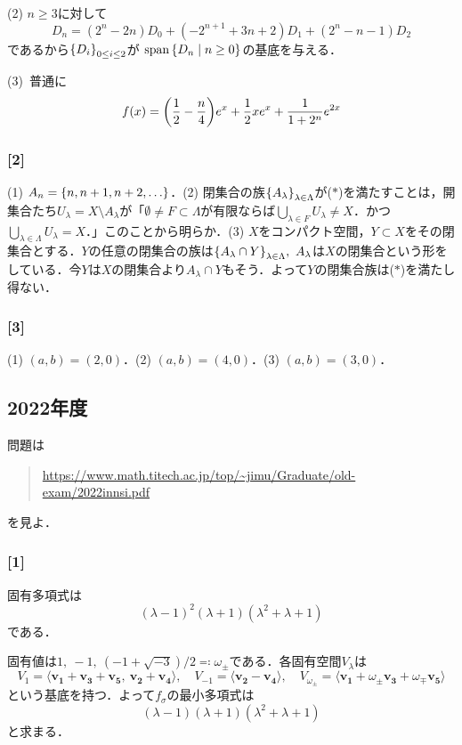 \documentclass[a4j]{ltjsarticle}
\newcommand{\1}{\mathbbm{1}}
\numberwithin{equation}{section}
\theoremstyle{definition}
\begin{document}
(2) $n\geq 3$に対して
\begin{equation}
    D_n=(2^n-2n)D_0+(-2^{n+1}+3n+2)D_1+(2^n-n-1)D_2 
\end{equation}
であるから$\qty{D_i}_{0\leq i\leq 2}$が
$\mathop{\mathrm{span}}\qty{D_n\mid n\geq0}$の基底を与える．

(3)\ 普通に
\begin{equation}
    f(x)=\qty(\frac{1}{2}-\frac{n}{4})e^x+\frac{1}{2}xe^x+\frac{1}{1+2^n}e^{2x}
\end{equation}
\subsubsection*{[2]}
(1) $A_n=\qty{n,n+1,n+2,\ldots}$．(2) 閉集合の族$\qty{A_{\lambda}}_{\lambda\in\Lambda}$が($\ast$)を満たすことは，開集合たち$U_\lambda=X\setminus A_\lambda$が「$\emptyset\neq F\subset \Lambda$が有限ならば$\bigcup_{\lambda\in F}U_{\lambda}\neq X$．かつ$\bigcup_{\lambda\in\Lambda}U_{\lambda}=X$．」このことから明らか．(3) $X$をコンパクト空間，$Y\subset X$をその閉集合とする．$Y$の任意の閉集合の族は$\qty{A_{\lambda}\cap Y}_{\lambda\in\Lambda},\ A_{\lambda}$は$X$の閉集合という形をしている．今$Y$は$X$の閉集合より$A_{\lambda}\cap Y$もそう．よって$Y$の閉集合族は($\ast$)を満たし得ない．
\subsubsection*{[3]}
(1) $(a,b)=(2,0)$．(2) $(a,b)=(4,0)$．(3) $(a,b)=(3,0)$．
\subsection{2022年度}
問題は
\begin{quote}
    \url{https://www.math.titech.ac.jp/top/~jimu/Graduate/old-exam/2022innsi.pdf}
\end{quote}
を見よ．
\subsubsection*{[1]}
固有多項式は
\begin{equation}
    (\lambda-1)^2(\lambda+1)(\lambda^2+\lambda+1)
\end{equation}
である．

固有値は$1,\ -1,\ (-1+\sqrt{-3})/2\eqcolon \omega_{\pm}$である．各固有空間$V_{\lambda}$は
\begin{equation}
    V_{1}=\langle\bm{v_1}+\bm{v_3}+\bm{v_5},\ \bm{v_2}+\bm{v_4}\rangle,\quad V_{-1}=\langle\bm{v_2}-\bm{v_4}\rangle,\quad V_{\omega_{\pm}}=\langle\bm{v_1}+\omega_{\pm}\bm{v_3}+\omega_{\mp}\bm{v_5}\rangle
\end{equation}
という基底を持つ．よって$f_\sigma$の最小多項式は
\begin{equation}
    (\lambda-1)(\lambda+1)(\lambda^2+\lambda+1)
\end{equation}
と求まる．
\end{document}
